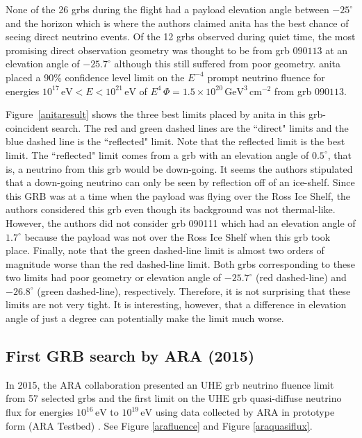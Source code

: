 None of the 26 \gls{grb}s during the flight had a payload elevation angle between $-25^{\circ}$ and the horizon which is where the authors claimed \gls{anita} has the best chance of seeing direct neutrino events. Of the 12 \gls{grbs} observed during quiet time, the most promising direct observation geometry was thought to be from \gls{grb} $090113$ at an elevation angle of $-25.7^{\circ}$ although this still suffered from poor geometry. \gls{anita} placed a 90\% confidence level limit on the $E^{-4}$ prompt neutrino fluence for energies $10^{17} \, \mathrm{eV} < E < 10^{21} \, \mathrm{eV}$ of $E^{4} \, \Phi = 1.5 \times 10^{20} \, \mathrm{ GeV^{3} \, cm^{-2}}$ from \gls{grb} $090113$. 

Figure~\ref{anitaresult} shows the three best limits placed by \gls{anita} in this \gls{grb}-coincident search. The red and green dashed lines are the ``direct" limits and the blue dashed line is the ``reflected" limit. Note that the reflected limit is the best limit. The ``reflected" limit comes from a \gls{grb} with an elevation angle of $0.5^{\circ}$, that is, a neutrino from this \gls{grb} would be down-going. It seems the authors stipulated that a down-going neutrino can only be seen by reflection off of an ice-shelf. Since this GRB was at a time when the payload was flying over the Ross Ice Shelf, the authors considered this \gls{grb} even though its background was not thermal-like. However, the authors did not consider \gls{grb} 090111 which had an elevation angle of $1.7^{\circ}$ because the payload was not over the Ross Ice Shelf when this \gls{grb} took place. Finally, note that the green dashed-line limit is almost two orders of magnitude worse than the red dashed-line limit. Both \gls{grbs} corresponding to these two limits had poor geometry or elevation angle of $-25.7^{\circ}$ (red dashed-line) and $-26.8^{\circ}$ (green dashed-line), respectively. 
Therefore, it is not surprising that these limits are not very tight. It is interesting, however, that a difference in elevation angle of just a degree can potentially make the limit much worse.

\subsection{First GRB search by ARA (2015)}

In 2015, the ARA collaboration presented an UHE \gls{grb} neutrino fluence limit from 57 selected \gls{grbs} and the first limit on the UHE \gls{grb} quasi-diffuse neutrino flux for energies $10^{16} \, \mathrm{ eV}$ to $10^{19} \, \mathrm{ eV}$ \cite{araproto} using data collected by ARA in prototype form (ARA Testbed) \cite{arahardware}. See Figure \ref{arafluence} and Figure \ref{araquasiflux}.

